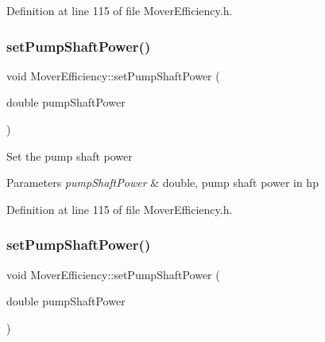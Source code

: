 Definition at line 115 of file Mover\+Efficiency.\+h.

\mbox{\label{class_mover_efficiency_afc2fea6487106318d441a0130ed2934d}} 
\subsubsection{\texorpdfstring{set\+Pump\+Shaft\+Power()}{setPumpShaftPower()}\hspace{0.1cm}{\footnotesize\ttfamily [2/3]}}
{\footnotesize\ttfamily void Mover\+Efficiency\+::set\+Pump\+Shaft\+Power (\begin{DoxyParamCaption}\item[{double}]{pump\+Shaft\+Power }\end{DoxyParamCaption})\hspace{0.3cm}{\ttfamily [inline]}}

Set the pump shaft power 
\begin{DoxyParams}{Parameters}
{\em pump\+Shaft\+Power} & double, pump shaft power in hp \\
\hline
\end{DoxyParams}


Definition at line 115 of file Mover\+Efficiency.\+h.

\mbox{\label{class_mover_efficiency_afc2fea6487106318d441a0130ed2934d}} 
\subsubsection{\texorpdfstring{set\+Pump\+Shaft\+Power()}{setPumpShaftPower()}\hspace{0.1cm}{\footnotesize\ttfamily [3/3]}}
{\footnotesize\ttfamily void Mover\+Efficiency\+::set\+Pump\+Shaft\+Power (\begin{DoxyParamCaption}\item[{double}]{pump\+Shaft\+Power }\end{DoxyParamCaption})\hspace{0.3cm}{\ttfamily [inline]}}

